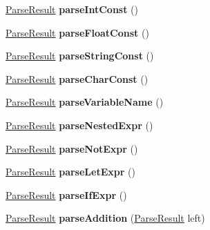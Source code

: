 \begin{DoxyCompactItemize}
\item 
\hypertarget{classParser_a2b200b744e5bedf82ef6f610d7877cfc}{\hyperlink{classParseResult}{Parse\-Result} {\bfseries parse\-Int\-Const} ()}\label{classParser_a2b200b744e5bedf82ef6f610d7877cfc}

\item 
\hypertarget{classParser_aaf7b1176fd53246f59577c7eec8b9d22}{\hyperlink{classParseResult}{Parse\-Result} {\bfseries parse\-Float\-Const} ()}\label{classParser_aaf7b1176fd53246f59577c7eec8b9d22}

\item 
\hypertarget{classParser_a4d8930d45c2b730912154c46cc54833c}{\hyperlink{classParseResult}{Parse\-Result} {\bfseries parse\-String\-Const} ()}\label{classParser_a4d8930d45c2b730912154c46cc54833c}

\item 
\hypertarget{classParser_a49c9b3d31ca060c97873e5485d518da3}{\hyperlink{classParseResult}{Parse\-Result} {\bfseries parse\-Char\-Const} ()}\label{classParser_a49c9b3d31ca060c97873e5485d518da3}

\item 
\hypertarget{classParser_a8c1baf62f71da64590e883e51ce622ca}{\hyperlink{classParseResult}{Parse\-Result} {\bfseries parse\-Variable\-Name} ()}\label{classParser_a8c1baf62f71da64590e883e51ce622ca}

\item 
\hypertarget{classParser_aec4c38e1e63c9becfd3a8fc4a1a73f01}{\hyperlink{classParseResult}{Parse\-Result} {\bfseries parse\-Nested\-Expr} ()}\label{classParser_aec4c38e1e63c9becfd3a8fc4a1a73f01}

\item 
\hypertarget{classParser_a1503ceff46112d6d4f0e01b5fb77afcd}{\hyperlink{classParseResult}{Parse\-Result} {\bfseries parse\-Not\-Expr} ()}\label{classParser_a1503ceff46112d6d4f0e01b5fb77afcd}

\item 
\hypertarget{classParser_aa24c33b04779801b330d7fe5a74349e5}{\hyperlink{classParseResult}{Parse\-Result} {\bfseries parse\-Let\-Expr} ()}\label{classParser_aa24c33b04779801b330d7fe5a74349e5}

\item 
\hypertarget{classParser_a555bc6f671d408208e6d049f8e9f3c86}{\hyperlink{classParseResult}{Parse\-Result} {\bfseries parse\-If\-Expr} ()}\label{classParser_a555bc6f671d408208e6d049f8e9f3c86}

\item 
\hypertarget{classParser_ae09cb2b5a7f80c6ad4ad9ccf27a746ca}{\hyperlink{classParseResult}{Parse\-Result} {\bfseries parse\-Addition} (\hyperlink{classParseResult}{Parse\-Result} left)}\label{classParser_ae09cb2b5a7f80c6ad4ad9ccf27a746ca}


\end{DoxyCompactItemize}
